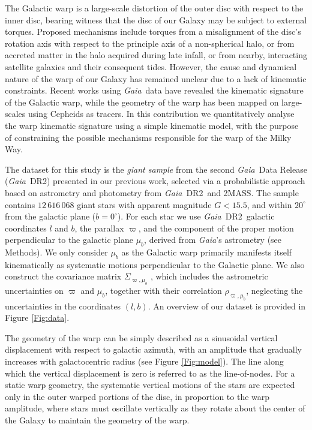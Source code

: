 \documentclass{nature}
\newcommand{\gaia}{\textit{Gaia}}
\newcommand{\gdrtwo}{\textit{Gaia}~DR2}
\begin{document}
The Galactic warp is a large-scale distortion of the outer disc with respect to the inner disc, bearing witness that the disc of our Galaxy may be subject to external torques. Proposed mechanisms include torques from a misalignment of the disc's rotation axis with respect to the principle axis of a non-spherical halo\cite{Sparke:1988,Dubinski:2009}, or from accreted matter in the halo acquired during late infall\cite{Jiang:1999,Shen:2006}, or from nearby, interacting satellite galaxies and their consequent tides\cite{Weinberg:2006,Laporte:2019}. However, the cause and dynamical nature of the warp of our Galaxy has remained unclear due to a lack of kinematic constraints. Recent works using \gaia\ data have revealed the kinematic signature of the Galactic warp\cite{MWDR2:2018,Liu:2017,Schoenrich:2018,Poggio:2018,Romero:2019,Carrillo:2019,LopezCorredoira:2019}, while the geometry of the warp has been mapped on large-scales using Cepheids as tracers\cite{Chen:2019,Skowron:2019}. In this contribution we quantitatively analyse the warp kinematic signature using a simple kinematic model, with the purpose of constraining the possible mechanisms responsible for the warp of the Milky Way.

The dataset for this study is the \emph{giant sample} from the second \gaia\ Data Release (\gdrtwo) presented in our previous work\cite{Poggio:2018}, selected via a probabilistic approach based on astrometry and photometry from \gdrtwo\, and 2MASS\cite{2MASS:2006}. The sample contains $12 \, 616 \, 068$ giant stars with apparent magnitude $G < 15.5$, and within $20^{\circ}$ from the galactic plane ($b=0^{\circ}$).  For each star we use \gdrtwo\ galactic coordinates $l$ and $b$, the parallax $\varpi$, and the component of the proper motion perpendicular to the galactic plane $\mu_{b}$, derived from \gaia's astrometry (see Methods). We only consider $\mu_{b}$ as the Galactic warp primarily manifests itself kinematically as systematic motions perpendicular to the Galactic plane\cite{Poggio:2017}. We also construct the covariance matrix $\Sigma_{\varpi,\mu_b}$ %
, which includes the astrometric uncertainties on $\varpi$ and $\mu_{b}$, together with their correlation $\rho_{\varpi,\mu_b}$, neglecting the uncertainties in the coordinates $(l,b)$. An overview of our dataset is provided in Figure \ref{Fig:data}. 

The geometry of the warp can be simply described as a sinusoidal vertical displacement with respect to galactic azimuth, with an amplitude that gradually increases with galactocentric radius (see Figure \ref{Fig:model}). The line along which the vertical displacement is zero is referred to as the line-of-nodes. For a static warp geometry, the systematic vertical motions of the stars are expected only in the outer warped portions of the disc, in proportion to the warp amplitude, where stars must oscillate vertically as they rotate about the center of the Galaxy to maintain the geometry of the warp. 
\end{document}
